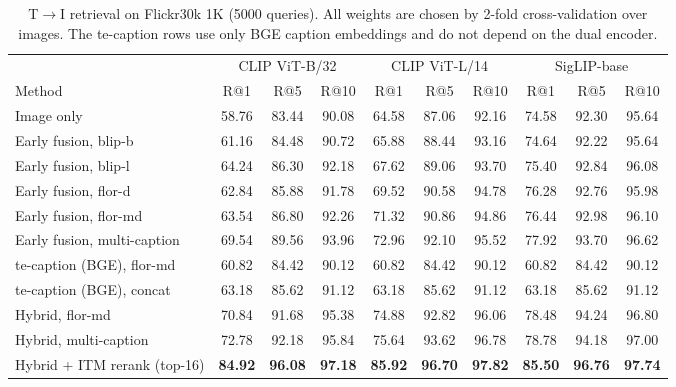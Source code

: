 \documentclass[conference]{IEEEtran}
\newcommand{\RA}{\ensuremath{\rightarrow}}
\newcommand{\best}[1]{\textbf{#1}}
\begin{document}
\begin{table}[t]
\centering
\caption{T\RA I retrieval on Flickr30k 1K (5000 queries). All weights are chosen by 2-fold cross-validation
over images. The te-caption rows use only BGE caption embeddings and do not depend on the dual encoder.}
\label{tab:part2}
\setlength{\tabcolsep}{4.5pt}
\begin{tabular}{l ccc ccc ccc}
\toprule
& \multicolumn{3}{c}{CLIP ViT-B/32} & \multicolumn{3}{c}{CLIP ViT-L/14} & \multicolumn{3}{c}{SigLIP-base} \\
\cmidrule(lr){2-4}\cmidrule(lr){5-7}\cmidrule(lr){8-10}
Method & R@1 & R@5 & R@10 & R@1 & R@5 & R@10 & R@1 & R@5 & R@10 \\
\midrule
Image only                   & 58.76 & 83.44 & 90.08 & 64.58 & 87.06 & 92.16 & 74.58 & 92.30 & 95.64 \\
\midrule
Early fusion, blip-b         & 61.16 & 84.48 & 90.72 & 65.88 & 88.44 & 93.16 & 74.64 & 92.22 & 95.64 \\
Early fusion, blip-l         & 64.24 & 86.30 & 92.18 & 67.62 & 89.06 & 93.70 & 75.40 & 92.84 & 96.08 \\
Early fusion, flor-d         & 62.84 & 85.88 & 91.78 & 69.52 & 90.58 & 94.78 & 76.28 & 92.76 & 95.98 \\
Early fusion, flor-md        & 63.54 & 86.80 & 92.26 & 71.32 & 90.86 & 94.86 & 76.44 & 92.98 & 96.10 \\
Early fusion, multi-caption  & 69.54 & 89.56 & 93.96 & 72.96 & 92.10 & 95.52 & 77.92 & 93.70 & 96.62 \\
\midrule
te-caption (BGE), flor-md    & 60.82 & 84.42 & 90.12 & 60.82 & 84.42 & 90.12 & 60.82 & 84.42 & 90.12 \\
te-caption (BGE), concat     & 63.18 & 85.62 & 91.12 & 63.18 & 85.62 & 91.12 & 63.18 & 85.62 & 91.12 \\
Hybrid, flor-md              & 70.84 & 91.68 & 95.38 & 74.88 & 92.82 & 96.06 & 78.48 & 94.24 & 96.80 \\
Hybrid, multi-caption        & 72.78 & 92.18 & 95.84 & 75.64 & 93.62 & 96.78 & 78.78 & 94.18 & 97.00 \\
\midrule
Hybrid + ITM rerank (top-16) & \best{84.92} & \best{96.08} & \best{97.18} & \best{85.92} & \best{96.70} & \best{97.82} & \best{85.50} & \best{96.76} & \best{97.74} \\
\bottomrule
\end{tabular}
\end{table}
\end{document}
